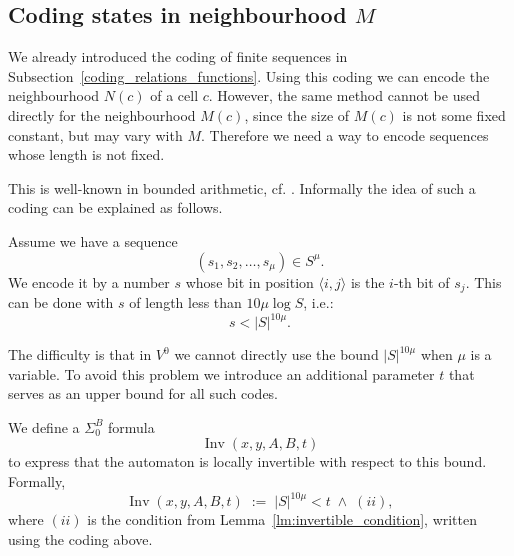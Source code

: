 \documentclass{article}
\theoremstyle{plain}
\theoremstyle{definition}
\DeclareMathOperator{\Inv}{Inv}
\begin{document}
\subsection{Coding states in neighbourhood $M$}
We already introduced the coding of finite sequences in Subsection~\ref{coding_relations_functions}.  Using this coding we can encode
the neighbourhood $N(c)$ of a cell $c$. However, the same method cannot be
used directly for the neighbourhood $M(c)$, since the size of $M(c)$ is not some fixed constant, but may vary with $M$.
Therefore we need a way to encode sequences whose length is not fixed. 

This is well-known in bounded arithmetic, cf. \cite[Lemma~9.3.2]{krajicek2019}. Informally the idea of such a coding can be explained as follows.

Assume we have a sequence
\[
(s_1,s_2,\dots,s_\mu) \in S^\mu .
\]
We encode it by a number $s$ whose bit in position $\langle i,j\rangle$ is the $i$-th bit of $s_j$. This can be done with $s$ of length 
less than $10 \mu \log S$, i.e.:
\[
s  < |S|^{10\mu}.
\]


The difficulty is that in $V^0$ we cannot directly use the bound
$|S|^{10\mu}$ when $\mu$ is a variable. To avoid this problem we introduce an
additional parameter $t$ that serves as an upper bound for all such codes.

We define a $\Sigma^B_0$ formula
\[
\Inv(x,y,A,B,t)
\]
to express that the automaton is locally invertible with respect to this
bound. Formally,
\[
\Inv(x,y,A,B,t) \;:=\;
|S|^{10\mu} < t \;\wedge\; (ii),
\]
where $(ii)$ is the condition from Lemma~\ref{lm:invertible_condition}, written using the coding above.

\medskip
\noindent{}
\medskip
\end{document}
